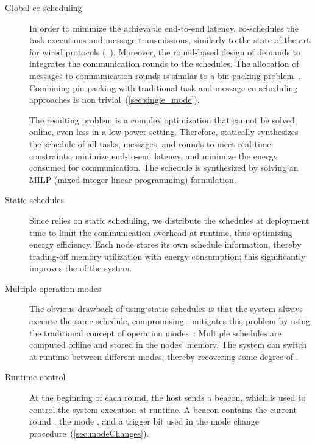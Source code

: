 \begin{description}

	\item [Global co-scheduling]
	In order to minimize the achievable end-to-end latency, \TTW co-schedules the task executions and message transmissions, similarly to the state-of-the-art for wired protocols (\eg~\cite{craciunas2016Combined,zhang2014Task}).
	Moreover, the round-based design of \TTnet demands to integrates the communication rounds to the schedules. The allocation of messages to communication rounds is similar to a bin-packing problem~\cite{wikipedia2019BinPacking}.
	Combining pin-packing with traditional task-and-message co-scheduling approaches is non trivial~(\cref{sec:single_mode}).

	The resulting problem is a complex optimization that cannot be solved online, even less in a low-power setting.
	Therefore, \TTW statically synthesizes the schedule of all tasks, messages, and rounds to meet real-time constraints, minimize end-to-end latency, and minimize the energy consumed for communication.
	The schedule is synthesized by solving an MILP (mixed integer linear programming) formulation.

	\item[Static schedules]
	Since \TTW relies on static scheduling, we distribute the schedules at deployment time to limit the communication overhead at runtime, thus optimizing energy efficiency.
	Each node stores its own schedule information, thereby trading-off memory utilization with energy consumption; this significantly improves the  of the system.



	\item[Multiple operation modes]
	The obvious drawback of using static schedules is that the system always execute the same schedule, compromising .
	\TTW mitigates this problem by using the traditional concept of operation modes~\cite{fohler1993changing}:
	Multiple schedules are computed offline and stored in the nodes' memory. The system can switch at runtime between different modes, thereby recovering some degree of .



	\item[Runtime control]
	At the beginning of each round, the host sends a beacon, which is used to control the system execution at runtime.
	A beacon contains the current round \id, the mode \id, and a trigger bit \SB used in the mode change procedure~(\cref{sec:modeChanges}).


\end{description}
